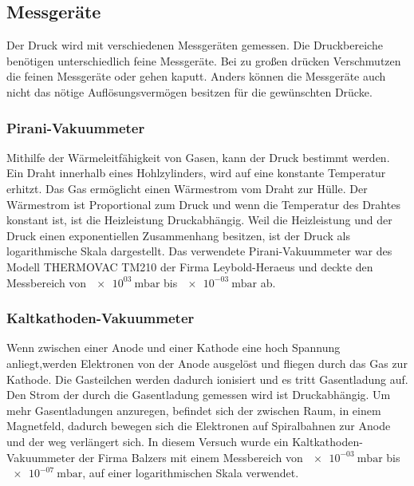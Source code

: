 \subsection{Messgeräte}
Der Druck wird mit verschiedenen Messgeräten gemessen. Die Druckbereiche benötigen unterschiedlich feine Messgeräte. Bei zu großen drücken Verschmutzen die feinen Messgeräte oder gehen kaputt. Anders können die Messgeräte auch nicht das nötige Auflösungsvermögen besitzen für die gewünschten Drücke.
\subsubsection{Pirani-Vakuummeter}
Mithilfe der Wärmeleitfähigkeit von Gasen, kann der Druck bestimmt werden. Ein Draht innerhalb eines Hohlzylinders, wird auf eine konstante Temperatur erhitzt. Das Gas ermöglicht einen Wärmestrom vom Draht zur Hülle. Der Wärmestrom ist Proportional zum Druck und wenn die Temperatur des Drahtes konstant ist, ist die Heizleistung Druckabhängig. %
Weil die Heizleistung und der Druck einen exponentiellen Zusammenhang besitzen, ist der Druck als logarithmische Skala dargestellt\cite{Pfeifer13}.
Das verwendete Pirani-Vakuummeter war des Modell THERMOVAC TM210 der Firma 
Leybold-Heraeus und deckte den Messbereich von $\SI{e03}{\milli\bar}$ bis $\SI{e-03}{\milli\bar}$ ab.    


\subsubsection{Kaltkathoden-Vakuummeter}
Wenn zwischen einer Anode und einer Kathode eine hoch Spannung anliegt,werden Elektronen von der Anode ausgelöst und fliegen durch das Gas zur Kathode. Die Gasteilchen werden dadurch ionisiert und es tritt Gasentladung auf. Den Strom der durch die Gasentladung gemessen wird ist Druckabhängig. 
Um mehr Gasentladungen anzuregen, befindet sich der zwischen Raum, in einem Magnetfeld, dadurch bewegen sich die Elektronen auf Spiralbahnen zur Anode und der weg verlängert sich\cite{Pfeifer13}.
In diesem Versuch wurde ein Kaltkathoden-Vakuummeter der Firma Balzers
mit einem Messbereich von $\SI{e-03}{\milli\bar}$ bis $\SI{e-07}{\milli\bar}$, auf einer logarithmischen Skala verwendet.
